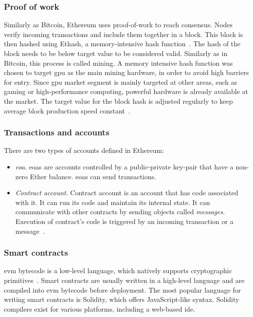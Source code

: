 \subsubsection{Proof of work}
Similarly as Bitcoin, Ethereum uses proof-of-work to reach consensus. Nodes verify incoming transactions and include them together in a block. This block is then hashed using Ethash, a memory-intensive hash function~\cite[p. 211]{Tikhomirov2018Ethereum:Perspectives}. The hash of the block needs to be below target value to be considered valid. Similarly as in Bitcoin, this process is called mining.  A memory intensive hash function was chosen to target \acrshort{gpu} as the main mining hardware, in order to avoid high barriers for entry. Since \acrshort{gpu} market segment is mainly targeted at other areas, such as gaming or high-performance computing, powerful hardware is already available at the market\footnotemark. The target value for the block hash is adjusted regularly to keep average block production speed constant~\cite{Tikhomirov2018Ethereum:Perspectives}.
% 

\subsubsection{Transactions and accounts}
There are two types of accounts defined in Ethereum:
\begin{itemize}[noitemsep]
    \item \textit{\acrfull{eoa}}. \acrshort{eoa}s are accounts controlled by a public-private key-pair that have a non-zero Ether balance. \acrshort{eoa}s can send transactions.~\cite{EthereumCommunityEthereumDocumentation}
    \item \textit{Contract account}. Contract account is an account that has code associated with it. It can run its code and maintain its internal state. It can communicate with other contracts by sending objects called \textit{messages}. Execution of contract's code is triggered by an incoming transaction or a message~\cite{EthereumCommunityEthereumDocumentation}.
\end{itemize}

\subsubsection{Smart contracts}
\acrshort{evm} bytecode is a low-level language, which natively supports cryptographic primitives~\cite{Tikhomirov2018Ethereum:Perspectives}. Smart contracts are usually written in a high-level language and are compiled into \acrshort{evm} bytecode before deployment. The most popular language for writing smart contracts is Solidity, which offers JavaScript-like syntax. Solidity compilers exist for various platforms, including a web-based \acrshort{ide}.

